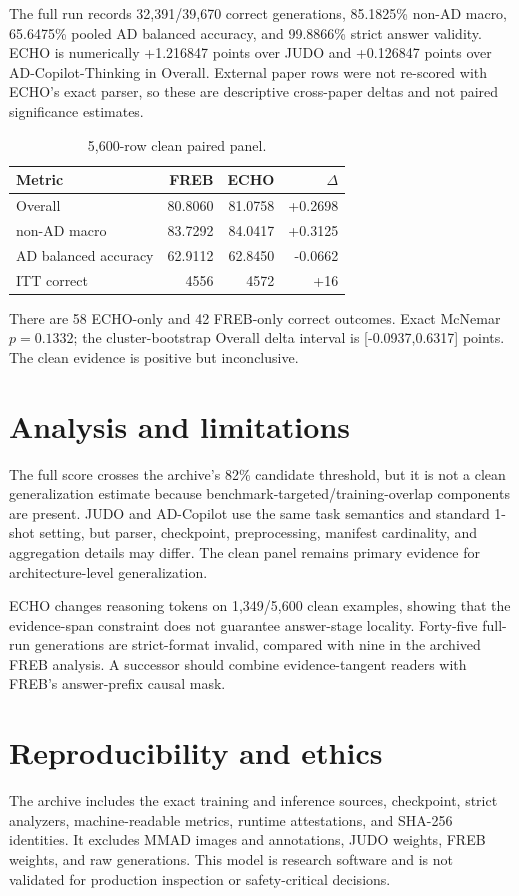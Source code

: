 \documentclass[10pt]{article}
\begin{document}
The full run records 32,391/39,670 correct generations, 85.1825\% non-AD
macro, 65.6475\% pooled AD balanced accuracy, and 99.8866\% strict answer
validity. ECHO is numerically +1.216847 points over JUDO and +0.126847 points
over AD-Copilot-Thinking in Overall. External paper rows were not re-scored
with ECHO's exact parser, so these are descriptive cross-paper deltas and not
paired significance estimates.

\begin{table}[t]
\centering
\caption{5,600-row clean paired panel.}
\begin{tabular}{lrrr}
\toprule
Metric & FREB & ECHO & $\Delta$ \\
\midrule
Overall & 80.8060 & 81.0758 & +0.2698 \\
non-AD macro & 83.7292 & 84.0417 & +0.3125 \\
AD balanced accuracy & 62.9112 & 62.8450 & -0.0662 \\
ITT correct & 4556 & 4572 & +16 \\
\bottomrule
\end{tabular}
\label{tab:clean}
\end{table}

There are 58 ECHO-only and 42 FREB-only correct outcomes. Exact McNemar
$p=0.1332$; the cluster-bootstrap Overall delta interval is
[-0.0937,0.6317] points. The clean evidence is positive but inconclusive.

\section{Analysis and limitations}
The full score crosses the archive's 82\% candidate threshold, but it is not a
clean generalization estimate because benchmark-targeted/training-overlap
components are present. JUDO and AD-Copilot use the same task semantics and
standard 1-shot setting, but parser, checkpoint, preprocessing, manifest
cardinality, and aggregation details may differ. The clean panel remains
primary evidence for architecture-level generalization.

ECHO changes reasoning tokens on 1,349/5,600 clean examples, showing that the
evidence-span constraint does not guarantee answer-stage locality. Forty-five
full-run generations are strict-format invalid, compared with nine in the
archived FREB analysis. A successor should combine evidence-tangent readers
with FREB's answer-prefix causal mask.

\section{Reproducibility and ethics}
The archive includes the exact training and inference sources, checkpoint,
strict analyzers, machine-readable metrics, runtime attestations, and SHA-256
identities. It excludes MMAD images and annotations, JUDO weights, FREB weights,
and raw generations. This model is research software and is not validated for
production inspection or safety-critical decisions.
\end{document}
